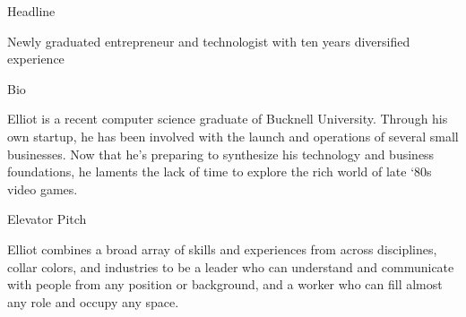 \documentclass{resume} %
\begin{document}

\begin{rSection}{Headline}

Newly graduated entrepreneur and technologist with ten years diversified experience \\

\end{rSection}


\begin{rSection}{Bio}

Elliot is a recent computer science graduate of Bucknell University. Through his own startup, he has been involved with the launch and operations of several small businesses. Now that he’s preparing to synthesize his technology and business foundations, he laments the lack of time to explore the rich world of late ‘80s video games. \\

\end{rSection}


\begin{rSection}{Elevator Pitch}

Elliot combines a broad array of skills and experiences from across disciplines, collar colors, and industries to be a leader who can understand and communicate with people from any position or background, and a worker who can fill almost any role and occupy any space. \\

\end{rSection}

\end{document}

